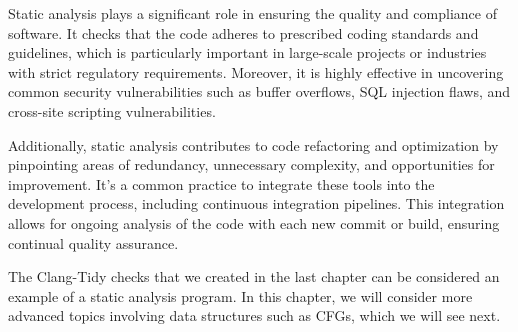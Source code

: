Static analysis plays a significant role in ensuring the quality and compliance of software. It checks that the code adheres to prescribed coding standards and guidelines, which is particularly important in large-scale projects or industries with strict regulatory requirements. Moreover, it is highly effective in uncovering common security vulnerabilities such as buffer overflows, SQL injection flaws, and cross-site scripting vulnerabilities.

Additionally, static analysis contributes to code refactoring and optimization by pinpointing areas of redundancy, unnecessary complexity, and opportunities for improvement. It's a common practice to integrate these tools into the development process, including continuous integration pipelines. This integration allows for ongoing analysis of the code with each new commit or build, ensuring continual quality assurance.

The Clang-Tidy checks that we created in the last chapter can be considered an example of a static analysis program. In this chapter, we will consider more advanced topics involving data structures such as CFGs, which we will see next.
